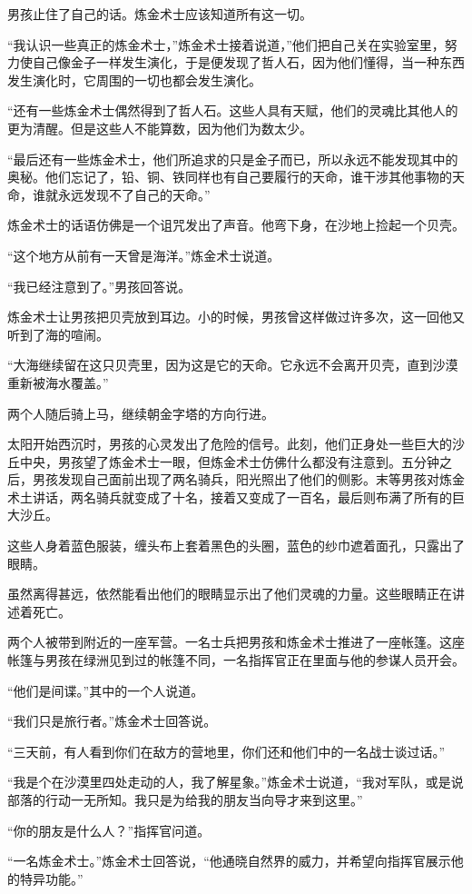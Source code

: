 \documentclass[twoside,openany]{book}
\begin{document}
男孩止住了自己的话。炼金术士应该知道所有这一切。

“我认识一些真正的炼金术士，”炼金术士接着说道，”他们把自己关在实验室里，努力使自己像金子一样发生演化，于是便发现了哲人石，因为他们懂得，当一种东西发生演化时，它周围的一切也都会发生演化。

“还有一些炼金术士偶然得到了哲人石。这些人具有天赋，他们的灵魂比其他人的更为清醒。但是这些人不能算数，因为他们为数太少。

“最后还有一些炼金术士，他们所追求的只是金子而已，所以永远不能发现其中的奥秘。他们忘记了，铅、铜、铁同样也有自己要履行的天命，谁干涉其他事物的天命，谁就永远发现不了自己的天命。”

炼金术士的话语仿佛是一个诅咒发出了声音。他弯下身，在沙地上捡起一个贝壳。

“这个地方从前有一天曾是海洋。”炼金术士说道。

“我已经注意到了。”男孩回答说。

炼金术士让男孩把贝壳放到耳边。小的时候，男孩曾这样做过许多次，这一回他又听到了海的喧闹。

“大海继续留在这只贝壳里，因为这是它的天命。它永远不会离开贝壳，直到沙漠重新被海水覆盖。”

两个人随后骑上马，继续朝金字塔的方向行进。

太阳开始西沉时，男孩的心灵发出了危险的信号。此刻，他们正身处一些巨大的沙丘中央，男孩望了炼金术士一眼，但炼金术士仿佛什么都没有注意到。五分钟之后，男孩发现自己面前出现了两名骑兵，阳光照出了他们的侧影。末等男孩对炼金术土讲话，两名骑兵就变成了十名，接着又变成了一百名，最后则布满了所有的巨大沙丘。

这些人身着蓝色服装，缠头布上套着黑色的头圈，蓝色的纱巾遮着面孔，只露出了眼睛。

虽然离得甚远，依然能看出他们的眼睛显示出了他们灵魂的力量。这些眼睛正在讲述着死亡。

两个人被带到附近的一座军营。一名士兵把男孩和炼金术士推进了一座帐篷。这座帐篷与男孩在绿洲见到过的帐篷不同，一名指挥官正在里面与他的参谋人员开会。

“他们是间谍。”其中的一个人说道。

“我们只是旅行者。”炼金术士回答说。

“三天前，有人看到你们在敌方的营地里，你们还和他们中的一名战士谈过话。”

“我是个在沙漠里四处走动的人，我了解星象。”炼金术士说道，“我对军队，或是说部落的行动一无所知。我只是为给我的朋友当向导才来到这里。”

“你的朋友是什么人？”指挥官问道。

“一名炼金术士。”炼金术士回答说，“他通晓自然界的威力，并希望向指挥官展示他的特异功能。”
\end{document}
